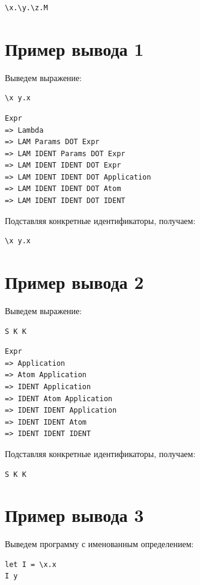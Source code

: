 \documentclass[12pt,a4paper]{article}
\begin{document}
\begin{verbatim}
\x.\y.\z.M
\end{verbatim}

\section*{Пример вывода 1}

Выведем выражение:

\begin{verbatim}
\x y.x
\end{verbatim}

\begin{verbatim}
Expr
=> Lambda
=> LAM Params DOT Expr
=> LAM IDENT Params DOT Expr
=> LAM IDENT IDENT DOT Expr
=> LAM IDENT IDENT DOT Application
=> LAM IDENT IDENT DOT Atom
=> LAM IDENT IDENT DOT IDENT
\end{verbatim}

Подставляя конкретные идентификаторы, получаем:

\begin{verbatim}
\x y.x
\end{verbatim}

\section*{Пример вывода 2}

Выведем выражение:

\begin{verbatim}
S K K
\end{verbatim}

\begin{verbatim}
Expr
=> Application
=> Atom Application
=> IDENT Application
=> IDENT Atom Application
=> IDENT IDENT Application
=> IDENT IDENT Atom
=> IDENT IDENT IDENT
\end{verbatim}

Подставляя конкретные идентификаторы, получаем:

\begin{verbatim}
S K K
\end{verbatim}

\section*{Пример вывода 3}

Выведем программу с именованным определением:

\begin{verbatim}
let I = \x.x
I y
\end{verbatim}
\end{document}
